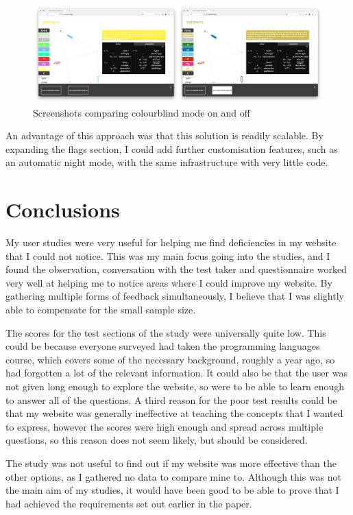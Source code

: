 \documentclass{l4proj}
\begin{document}
\begin{figure}[h!]
    \centering
    \includegraphics[width=1\linewidth]{dissertation/images/colourbind_collage.png}
    \caption{Screenshots comparing colourblind mode on and off}
    \label{fig:enter-label}
\end{figure}    

An advantage of this approach was that this solution is readily scalable.  By expanding the flags section, I could add further customisation features, such as an automatic night mode, with the same infrastructure with very little code.

\section{Conclusions}

My user studies were very useful for helping me find deficiencies in my website that I could not notice.  This was my main focus going into the studies, and I found the observation, conversation with the test taker and questionnaire worked very well at helping me to notice areas where I could improve my website.  By gathering multiple forms of feedback simultaneously, I believe that I was slightly able to compensate for the small sample size.

The scores for the test sections of the study were universally quite low.  This could be because everyone surveyed had taken the programming languages course, which covers some of the necessary background, roughly a year ago, so had forgotten a lot of the relevant information.  It could also be that the user was not given long enough to explore the website, so were to be able to learn enough to answer all of the questions.  A third reason for the poor test results could be that my website was generally ineffective at teaching the concepts that I wanted to express, however the scores were high enough and spread across multiple questions, so this reason does not seem likely, but should be considered.

The study was not useful to find out if my website was more effective than the other options, as I gathered no data to compare mine to.  Although this was not the main aim of my studies, it would have been good to be able to prove that I had achieved the requirements set out earlier in the paper.
\end{document}
